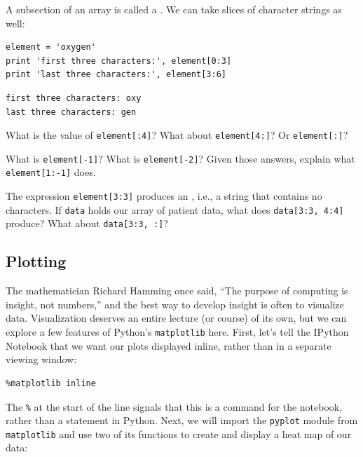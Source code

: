 \documentclass{book}
\begin{document}
A subsection of an array is called a . We can
take slices of character strings as well:

\begin{verbatim}
element = 'oxygen'
print 'first three characters:', element[0:3]
print 'last three characters:', element[3:6]
\end{verbatim}

\begin{verbatim}
first three characters: oxy
last three characters: gen
\end{verbatim}

\begin{swcenumerate}
\item
  What is the value of \texttt{element{[}:4{]}}? What about
  \texttt{element{[}4:{]}}? Or \texttt{element{[}:{]}}?
\item
  What is \texttt{element{[}-1{]}}? What is \texttt{element{[}-2{]}}?
  Given those answers, explain what \texttt{element{[}1:-1{]}} does.
\item
  The expression \texttt{element{[}3:3{]}} produces an
  , i.e., a string that contains
  no characters. If \texttt{data} holds our array of patient data, what
  does \texttt{data{[}3:3, 4:4{]}} produce? What about
  \texttt{data{[}3:3, :{]}}?
\end{swcenumerate}

\subsection{Plotting}

The mathematician Richard Hamming once said, ``The purpose of computing
is insight, not numbers,'' and the best way to develop insight is often
to visualize data. Visualization deserves an entire lecture (or course)
of its own, but we can explore a few features of Python's
\texttt{matplotlib} here. First, let's tell the IPython Notebook that we
want our plots displayed inline, rather than in a separate viewing
window:

\begin{verbatim}
%matplotlib inline
\end{verbatim}

The \texttt{\%} at the start of the line signals that this is a command
for the notebook, rather than a statement in Python. Next, we will
import the \texttt{pyplot} module from \texttt{matplotlib} and use two
of its functions to create and display a heat map of our data:
\end{document}
